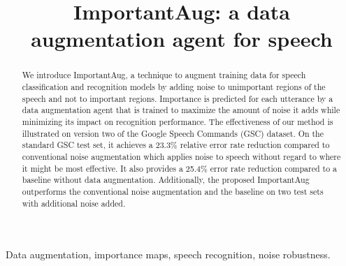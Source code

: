 \documentclass{article}
\title{ImportantAug: a data augmentation agent for speech}
\begin{document}
\ninept
\maketitle

\begin{abstract}
We introduce ImportantAug, a technique to augment training data for speech classification and recognition models by adding noise to unimportant regions of the speech and not to important regions. Importance is predicted for each utterance by a data augmentation agent that is trained to maximize the amount of noise it adds while minimizing its impact on recognition performance. The effectiveness of our method is illustrated on version two of the Google Speech Commands (GSC) dataset. On the standard GSC test set, it achieves a 23.3\% relative error rate reduction compared to conventional noise augmentation which applies noise to speech without regard to where it might be most effective. It also provides a 25.4\% error rate reduction compared to a baseline without data augmentation. Additionally, the proposed ImportantAug outperforms the conventional noise augmentation and the baseline on two test sets with additional noise added. 
\end{abstract}
\begin{keywords}
Data augmentation, importance maps, speech recognition, noise robustness.
\end{keywords}
\end{document}
